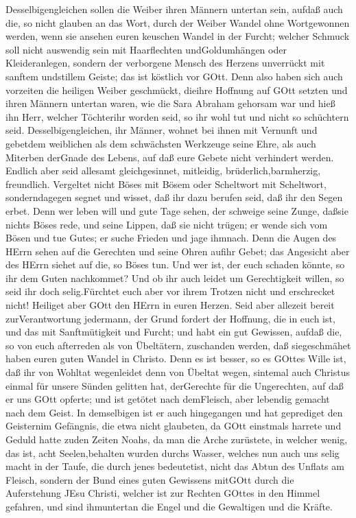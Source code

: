  Desselbigengleichen sollen die Weiber ihren Männern
untertan sein, aufdaß auch die, so nicht glauben an das Wort, durch der
Weiber Wandel ohne Wortgewonnen werden,  wenn sie ansehen
euren keuschen Wandel in der Furcht;  welcher Schmuck soll
nicht auswendig sein mit Haarflechten undGoldumhängen oder
Kleideranlegen,  sondern der verborgene Mensch des Herzens
unverrückt mit sanftem undstillem Geiste; das ist köstlich vor GOtt.
 Denn also haben sich auch vorzeiten die heiligen Weiber
geschmückt, dieihre Hoffnung auf GOtt setzten und ihren Männern untertan
waren,  wie die Sara Abraham gehorsam war und hieß ihn Herr,
welcher Töchterihr worden seid, so ihr wohl tut und nicht so schüchtern
seid.  Desselbigengleichen, ihr Männer, wohnet bei ihnen mit
Vernunft und gebetdem weiblichen als dem schwächsten Werkzeuge seine
Ehre, als auch Miterben derGnade des Lebens, auf daß eure Gebete nicht
verhindert werden.  Endlich aber seid allesamt
gleichgesinnet, mitleidig, brüderlich,barmherzig, freundlich.
 Vergeltet nicht Böses mit Bösem oder Scheltwort mit
Scheltwort, sonderndagegen segnet und wisset, daß ihr dazu berufen seid,
daß ihr den Segen erbet.  Denn wer leben will und gute Tage
sehen, der schweige seine Zunge, daßsie nichts Böses rede, und seine
Lippen, daß sie nicht trügen;  er wende sich vom Bösen und
tue Gutes; er suche Frieden und jage ihmnach.  Denn die
Augen des HErrn sehen auf die Gerechten und seine Ohren aufihr Gebet;
das Angesicht aber des HErrn siehet auf die, so Böses tun. 
Und wer ist, der euch schaden könnte, so ihr dem Guten nachkommet?
 Und ob ihr auch leidet um Gerechtigkeit willen, so seid
ihr doch selig.Fürchtet euch aber vor ihrem Trotzen nicht und
erschrecket nicht!  Heiliget aber GOtt den HErrn in euren
Herzen. Seid aber allezeit bereit zurVerantwortung jedermann, der Grund
fordert der Hoffnung, die in euch ist,  und das mit
Sanftmütigkeit und Furcht; und habt ein gut Gewissen, aufdaß die, so von
euch afterreden als von Übeltätern, zuschanden werden, daß siegeschmähet
haben euren guten Wandel in Christo.  Denn es ist besser,
so es GOttes Wille ist, daß ihr von Wohltat wegenleidet denn von Übeltat
wegen,  sintemal auch Christus einmal für unsere Sünden
gelitten hat, derGerechte für die Ungerechten, auf daß er uns GOtt
opferte; und ist getötet nach demFleisch, aber lebendig gemacht nach dem
Geist.  In demselbigen ist er auch hingegangen und hat
geprediget den Geisternim Gefängnis,  die etwa nicht
glaubeten, da GOtt einstmals harrete und Geduld hatte zuden Zeiten
Noahs, da man die Arche zurüstete, in welcher wenig, das ist, acht
Seelen,behalten wurden durchs Wasser,  welches nun auch uns
selig macht in der Taufe, die durch jenes bedeutetist, nicht das Abtun
des Unflats am Fleisch, sondern der Bund eines guten Gewissens mitGOtt
durch die Auferstehung JEsu Christi,  welcher ist zur
Rechten GOttes in den Himmel gefahren, und sind ihmuntertan die Engel
und die Gewaltigen und die Kräfte.

